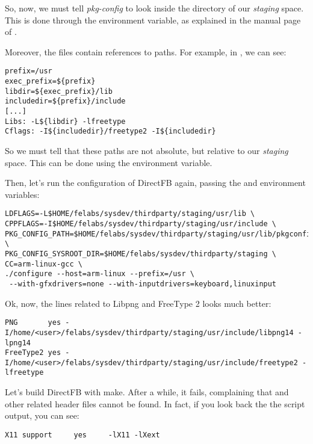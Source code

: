 So, now, we must tell {\em pkg-config} to look inside the
 directory of our {\em staging} space. This
is done through the  environment variable, as
explained in the manual page of .

Moreover, the  files contain references to paths. For
example, in
,
we can see:

\begin{verbatim}
prefix=/usr
exec_prefix=${prefix}
libdir=${exec_prefix}/lib
includedir=${prefix}/include
[...]
Libs: -L${libdir} -lfreetype
Cflags: -I${includedir}/freetype2 -I${includedir}
\end{verbatim}

So we must tell  that these paths are not absolute,
but relative to our {\em staging} space. This can be done using the
 environment variable.

Then, let's run the configuration of DirectFB again, passing the
 and  environment
variables:

\small
\begin{verbatim}
LDFLAGS=-L$HOME/felabs/sysdev/thirdparty/staging/usr/lib \
CPPFLAGS=-I$HOME/felabs/sysdev/thirdparty/staging/usr/include \
PKG_CONFIG_PATH=$HOME/felabs/sysdev/thirdparty/staging/usr/lib/pkgconfig \
PKG_CONFIG_SYSROOT_DIR=$HOME/felabs/sysdev/thirdparty/staging \
CC=arm-linux-gcc \
./configure --host=arm-linux --prefix=/usr \
 --with-gfxdrivers=none --with-inputdrivers=keyboard,linuxinput
\end{verbatim}
\normalsize

Ok, now, the lines related to Libpng and FreeType 2 looks much better:

\footnotesize
\begin{verbatim}
PNG       yes -I/home/<user>/felabs/sysdev/thirdparty/staging/usr/include/libpng14 -lpng14
FreeType2 yes -I/home/<user>/felabs/sysdev/thirdparty/staging/usr/include/freetype2 -lfreetype
\end{verbatim}
\normalsize

Let's build DirectFB with make. After a while, it fails, complaining
that \code{X11/Xlib.h} and other related header files cannot be
found. In fact, if you look back the the \code{./configure} script
output, you can see:

\begin{verbatim}
X11 support		yes		-lX11 -lXext
\end{verbatim}

